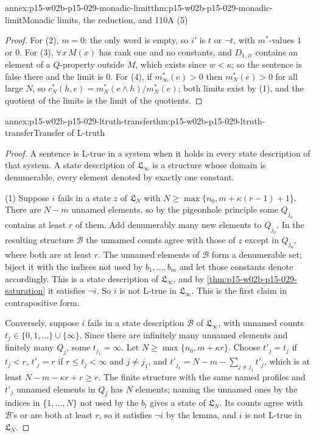 \begin{annexitem}{annex:p15-w02b-p15-029-monadic-limit}{thm:p15-w02b-p15-029-monadic-limit}{Monadic limits, the reduction, and 110A (5)}
\begin{proof}
For (2), \(m=0\): the only word is empty, so \(i'\) is \(t\) or
\(\neg t\), with \(m^*\)-values \(1\) or \(0\). For (3),
\(\forall x\,M(x)\) has rank one and no constants, and
\(D_{1,\varnothing}\) contains an element of a \(Q\)-property outside
\(M\), which exists since \(w<\kappa\); so the sentence is false there
and the limit is \(0\). For (4), if
\(m^*_\infty(e)>0\) then \(m^*_N(e)>0\) for all large \(N\), so
\(c^*_N(h,e)=m^*_N(e\land h)/m^*_N(e)\); both limits exist by (1),
and the quotient of the limits is the limit of the quotients.
\end{proof}
\end{annexitem}

\begin{annexitem}{annex:p15-w02b-p15-029-ltruth-transfer}{thm:p15-w02b-p15-029-ltruth-transfer}{Transfer of L-truth}
\begin{proof}
A sentence is L-true in a system when it holds in every state
description of that system. A state description of
\(\mathfrak L_\infty\) is a structure whose domain is denumerable,
every element denoted by exactly one constant.

(1) Suppose \(i\) fails in a state \(z\) of \(\mathfrak L_N\) with
\(N\geq\max\{n_0,m+\kappa(r-1)+1\}\). There are \(N-m\) unnamed
elements, so by the pigeonhole principle some \(Q_{j_0}\) contains at
least \(r\) of them. Add denumerably many new elements to
\(Q_{j_0}\). In the resulting structure \(\mathcal B\) the unnamed
counts agree with those of \(z\) except in \(Q_{j_0}\), where both are
at least \(r\). The unnamed elements of \(\mathcal B\) form a
denumerable set; biject it with the indices not used by
\(b_1,\ldots,b_m\) and let those constants denote accordingly. This
is a state description of \(\mathfrak L_\infty\), and by
\cref{thm:p15-w02b-p15-029-saturation} it satisfies \(\neg i\). So
\(i\) is not L-true in \(\mathfrak L_\infty\). This is the first
claim in contrapositive form.

Conversely, suppose \(i\) fails in a state description \(\mathcal B\)
of \(\mathfrak L_\infty\), with unnamed counts
\(t_j\in\{0,1,\ldots\}\cup\{\infty\}\). Since there are infinitely
many unnamed elements and finitely many \(Q_j\), some
\(t_{j_1}=\infty\). Let \(N\geq\max\{n_0,m+\kappa r\}\). Choose
\(t'_j=t_j\) if \(t_j<r\), \(t'_j=r\) if \(r\leq t_j<\infty\) and
\(j\ne j_1\), and \(t'_{j_1}=N-m-\sum_{j\ne j_1}t'_j\), which is at
least \(N-m-\kappa r+r\geq r\). The finite structure with the same
named profiles and \(t'_j\) unnamed elements in \(Q_j\) has
\(N\) elements; naming the unnamed ones by the indices in
\(\{1,\ldots,N\}\) not used by the \(b_l\) gives a state of
\(\mathfrak L_N\). Its counts agree with \(\mathcal B\)'s or are both at
least \(r\), so it satisfies \(\neg i\) by the lemma, and \(i\) is not
L-true in \(\mathfrak L_N\).


\end{proof}
\end{annexitem}
